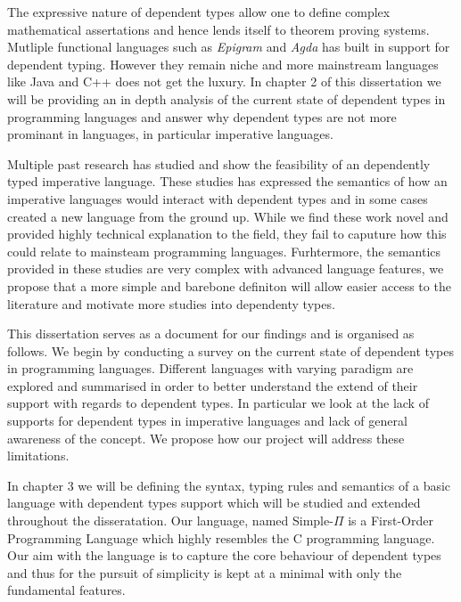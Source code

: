 \documentclass[a4paper,12pt]{report}
\begin{document}
\par
The expressive nature of dependent types allow one to define complex 
mathematical assertations and hence lends itself to theorem proving systems. 
Mutliple functional languages such as \textit{Epigram} 
\cite{epigram} and \textit{Agda} \cite{agda} has 
built in support for dependent typing. However they remain niche and more 
mainstream languages like Java and C++ does not get the luxury. In chapter 2 of 
this dissertation we will be providing an in depth analysis of the current state 
of dependent types in programming languages and answer why dependent types are 
not more prominant in languages, in particular imperative languages.

\par
Multiple past research has studied and show the feasibility of an dependently typed 
imperative language. These studies has expressed the semantics of 
how an imperative languages would interact with dependent types and in some 
cases created a new language from the ground up. While we find these work novel 
and provided highly technical explanation to the field, they fail to caputure 
how this could relate to mainsteam programming languages. Furhtermore, the 
semantics provided in these studies are very complex with advanced language 
features, we propose that a more simple and barebone definiton will allow easier 
access to the literature and motivate more studies into dependenty types. 

\par
This dissertation serves as a document for our findings and is organised as 
follows. We begin by conducting a survey on the current state of dependent types 
in programming languages. Different languages with varying paradigm are explored 
and summarised in order to better understand the extend of their support 
with regards to dependent types. In particular we look at the lack of supports 
for dependent types in imperative languages and lack of general awareness of the 
concept. We propose how our project will address these limitations. 

\par
In chapter 3 we will be defining the syntax, typing rules and semantics 
of a basic language with dependent types support which will be studied 
and extended throughout the disseratation. Our language, named Simple-$\Pi$ is a 
First-Order Programming Language which highly resembles the C programming 
language. Our aim with the language is to capture the core behaviour of 
dependent types and thus for the pursuit of simplicity is kept at a minimal with 
only the fundamental features. 
\end{document}
